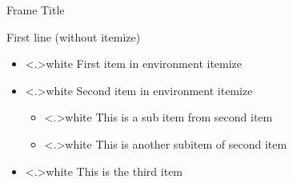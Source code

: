 \begin{frame}{Frame Title}
    \begin{slimcol}
        First line (without itemize)
        \pause
        \begin{itemize}[<+->]\color{darkgray}
            \item \color<.>{white} First item in environment itemize
            \item \color<.>{white} Second item in environment itemize
            \begin{itemize}[<+->]\color{darkgray}
                \item \color<.>{white} This is a sub item from second item
                \item \color<.>{white} This is another subitem of second item
            \end{itemize}
            \item \color<.>{white} This is the third item
        \end{itemize}
    \end{slimcol}
\end{frame}

